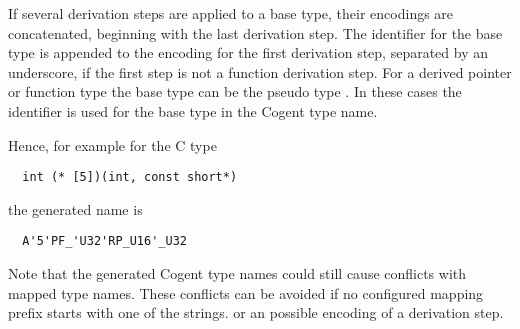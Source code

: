 If several derivation steps are applied to a base type, their encodings are concatenated, beginning with the 
last derivation step. The identifier for the base type is appended to the encoding for the first derivation step,
separated by an underscore, if the first step is not a function derivation step. For a derived pointer or 
function type the base type can be the pseudo type . In these cases the identifier  is
used for the base type in the Cogent type name.

Hence, for example for the C type
\begin{verbatim}
  int (* [5])(int, const short*)
\end{verbatim}
the generated name is
\begin{verbatim}
  A'5'PF_'U32'RP_U16'_U32
\end{verbatim}

Note that the generated Cogent type names could still cause conflicts with mapped type names. These conflicts can be
avoided if no configured mapping prefix starts with one of the  strings. 
or an possible encoding of a derivation step.
